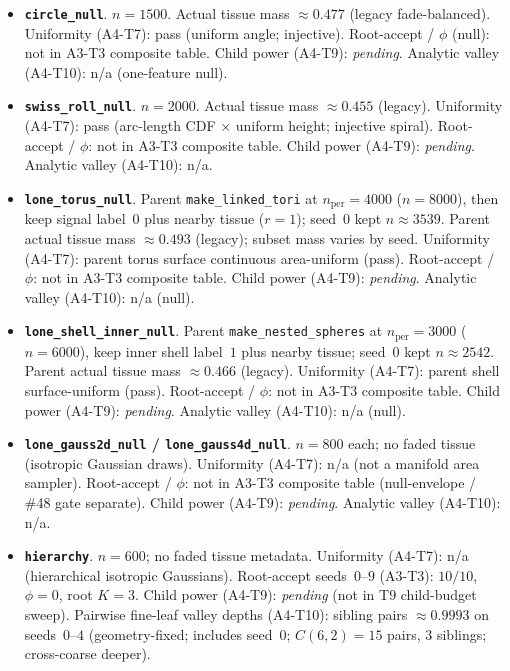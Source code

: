 \documentclass[11pt]{article}
\begin{document}
\begin{itemize}[leftmargin=1.2em]
  \item \textbf{\texttt{circle\_null}}.
  $n{=}1500$.
  Actual tissue mass $\approx 0.477$ (legacy fade-balanced).
  Uniformity (A4-T7): pass (uniform angle; injective).
  Root-accept / $\phi$ (null): not in A3-T3 composite table.
  Child power (A4-T9): \emph{pending}.
  Analytic valley (A4-T10): n/a (one-feature null).

  \item \textbf{\texttt{swiss\_roll\_null}}.
  $n{=}2000$.
  Actual tissue mass $\approx 0.455$ (legacy).
  Uniformity (A4-T7): pass (arc-length CDF $\times$ uniform height;
  injective spiral).
  Root-accept / $\phi$: not in A3-T3 composite table.
  Child power (A4-T9): \emph{pending}.
  Analytic valley (A4-T10): n/a.

  \item \textbf{\texttt{lone\_torus\_null}}.
  Parent \texttt{make\_linked\_tori} at $n_{\mathrm{per}}{=}4000$
  ($n{=}8000$), then keep signal label~$0$ plus nearby tissue
  ($r{=}1$); seed~$0$ kept $n{\approx}3539$.
  Parent actual tissue mass $\approx 0.493$ (legacy); subset mass
  varies by seed.
  Uniformity (A4-T7): parent torus surface continuous area-uniform
  (pass).
  Root-accept / $\phi$: not in A3-T3 composite table.
  Child power (A4-T9): \emph{pending}.
  Analytic valley (A4-T10): n/a (null).

  \item \textbf{\texttt{lone\_shell\_inner\_null}}.
  Parent \texttt{make\_nested\_spheres} at $n_{\mathrm{per}}{=}3000$
  ($n{=}6000$), keep inner shell label~$1$ plus nearby tissue;
  seed~$0$ kept $n{\approx}2542$.
  Parent actual tissue mass $\approx 0.466$ (legacy).
  Uniformity (A4-T7): parent shell surface-uniform (pass).
  Root-accept / $\phi$: not in A3-T3 composite table.
  Child power (A4-T9): \emph{pending}.
  Analytic valley (A4-T10): n/a (null).

  \item \textbf{\texttt{lone\_gauss2d\_null} / \texttt{lone\_gauss4d\_null}}.
  $n{=}800$ each; no faded tissue (isotropic Gaussian draws).
  Uniformity (A4-T7): n/a (not a manifold area sampler).
  Root-accept / $\phi$: not in A3-T3 composite table
  (null-envelope / \#48 gate separate).
  Child power (A4-T9): \emph{pending}.
  Analytic valley (A4-T10): n/a.

  \item \textbf{\texttt{hierarchy}}.
  $n{=}600$; no faded tissue metadata.
  Uniformity (A4-T7): n/a (hierarchical isotropic Gaussians).
  Root-accept seeds~$0$--$9$ (A3-T3): $10/10$, $\phi{=}0$, root $K{=}3$.
  Child power (A4-T9): \emph{pending} (not in T9 child-budget sweep).
  Pairwise fine-leaf valley depths (A4-T10): sibling pairs
  $\approx 0.9993$ on seeds~$0$--$4$ (geometry-fixed; includes seed~$0$;
  $C(6,2){=}15$ pairs, $3$ siblings; cross-coarse deeper).


\end{itemize}
\end{document}
